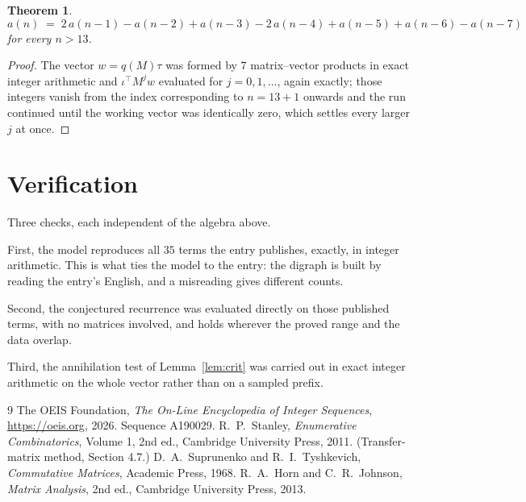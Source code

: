 \documentclass[11pt,a4paper]{article}
\theoremstyle{plain}
\newtheorem{theorem}{Theorem}
\theoremstyle{definition}
\begin{document}
\begin{theorem}
\[
a(n)\;=\;2\,a(n-1) - a(n-2) + a(n-3) - 2\,a(n-4) + a(n-5) + a(n-6) - a(n-7)
\]
for every $n>13$.
\end{theorem}

\begin{proof}
The vector $w=q(M)\tau$ was formed by $7$ matrix--vector products in exact integer
arithmetic and $\iota^{\!\top}M^{j}w$ evaluated for $j=0,1,\dots$, again exactly; those
integers vanish from the index corresponding to $n=13+1$ onwards and the run continued
until the working vector was identically zero, which settles every larger $j$ at once.
\end{proof}

\section{Verification}

Three checks, each independent of the algebra above.

First, the model reproduces all $35$ terms the entry publishes, exactly, in integer
arithmetic. This is what ties the model to the entry: the digraph is built by reading the
entry's English, and a misreading gives different counts.

Second, the conjectured recurrence was evaluated directly on those published terms, with no
matrices involved, and holds wherever the proved range and the data overlap.

Third, the annihilation test of Lemma~\ref{lem:crit} was carried out in exact integer
arithmetic on the whole vector rather than on a sampled prefix.

\begin{thebibliography}{9}
 The OEIS Foundation, \emph{The On-Line Encyclopedia of Integer
Sequences}, \url{https://oeis.org}, 2026. Sequence A190029.
 R.~P.~Stanley, \emph{Enumerative Combinatorics}, Volume 1, 2nd ed.,
Cambridge University Press, 2011. (Transfer-matrix method, Section 4.7.)
 D.~A.~Suprunenko and R.~I.~Tyshkevich, \emph{Commutative Matrices},
Academic Press, 1968.
 R.~A.~Horn and C.~R.~Johnson, \emph{Matrix Analysis}, 2nd ed., Cambridge
University Press, 2013.
\end{thebibliography}
\end{document}
